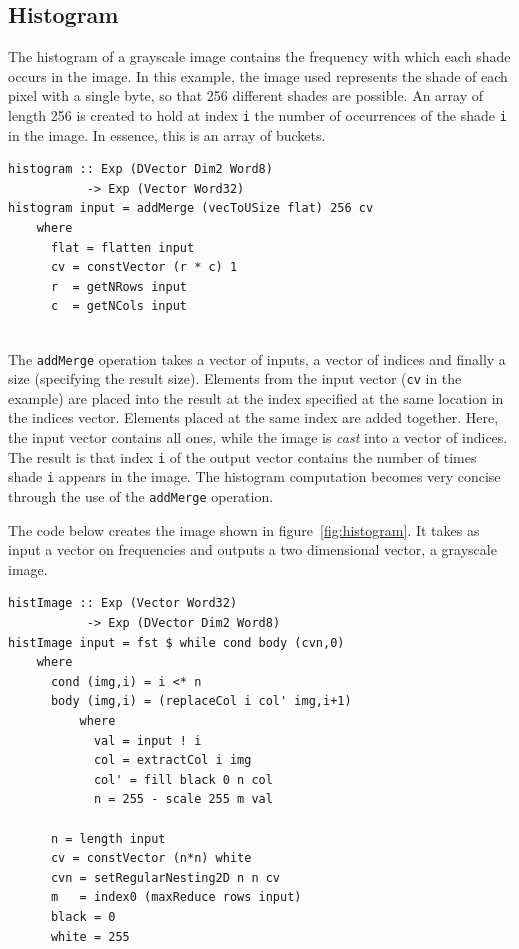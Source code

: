 \subsection{Histogram}
\FloatBarrier

The histogram of a grayscale image contains the frequency with 
which each shade occurs in the image. In this example, the image used represents 
the shade of each pixel with a single byte, so that
256 different shades are possible. An array of length 256 is created to hold at index 
{\tt i} the number of occurrences of the shade {\tt i} in the image. In essence, this 
is an array of buckets. 

\begin{verbatim}
histogram :: Exp (DVector Dim2 Word8)  
           -> Exp (Vector Word32)
histogram input = addMerge (vecToUSize flat) 256 cv
    where
      flat = flatten input
      cv = constVector (r * c) 1 
      r  = getNRows input 
      c  = getNCols input
      
\end{verbatim}

The {\tt addMerge} operation takes a vector of inputs, a vector of 
indices and finally a size (specifying the result size). Elements from the 
input vector ({\tt cv} in the example) are placed into the result
at the index specified at 
the same location in the indices vector. Elements placed at the same
index are added together. Here, the input vector contains all ones, 
while the image is {\em cast} into a vector of indices.
The result 
is that index {\tt i} of the output vector contains the number of times
shade {\tt i} appears in the image.
The histogram
computation becomes very concise through the use of the {\tt addMerge} operation.

The code below creates the image shown in figure~\ref{fig:histogram}. It 
takes as input a vector on frequencies and outputs a two dimensional vector, 
a grayscale image. 

\begin{verbatim}
histImage :: Exp (Vector Word32) 
           -> Exp (DVector Dim2 Word8) 
histImage input = fst $ while cond body (cvn,0)    
    where 
      cond (img,i) = i <* n 
      body (img,i) = (replaceCol i col' img,i+1) 
          where 
            val = input ! i 
            col = extractCol i img
            col' = fill black 0 n col
            n = 255 - scale 255 m val  
                    
      n = length input 
      cv = constVector (n*n) white  
      cvn = setRegularNesting2D n n cv
      m   = index0 (maxReduce rows input)
      black = 0 
      white = 255
\end{verbatim}

